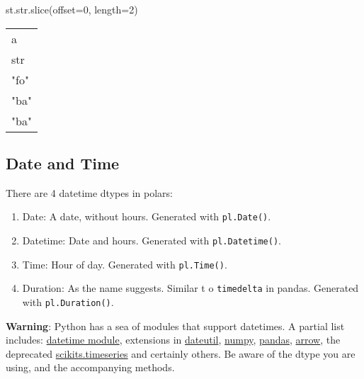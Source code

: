 \documentclass[
  letterpaper,
  DIV=11,
  numbers=noendperiod]{scrartcl}
\newenvironment{Shaded}{\begin{snugshade}}{\end{snugshade}}
\newcommand{\BuiltInTok}[1]{\textcolor[rgb]{0.00,0.23,0.31}{#1}}
\newcommand{\DecValTok}[1]{\textcolor[rgb]{0.68,0.00,0.00}{#1}}
\newcommand{\NormalTok}[1]{\textcolor[rgb]{0.00,0.23,0.31}{#1}}
\newcommand{\OperatorTok}[1]{\textcolor[rgb]{0.37,0.37,0.37}{#1}}
\providecommand{\tightlist}{%
  \setlength{\itemsep}{0pt}\setlength{\parskip}{0pt}}\usepackage{longtable,booktabs,array}
\begin{document}
\begin{Shaded}
\begin{Highlighting}[]
\NormalTok{st.}\BuiltInTok{str}\NormalTok{.}\BuiltInTok{slice}\NormalTok{(offset}\OperatorTok{=}\DecValTok{0}\NormalTok{, length}\OperatorTok{=}\DecValTok{2}\NormalTok{)}
\end{Highlighting}
\end{Shaded}

\begin{longtable}[]{@{}l@{}}
\toprule()
a \\
str \\
\midrule()
\endhead
"fo" \\
"ba" \\
"ba" \\
\bottomrule()
\end{longtable}

\hypertarget{date-and-time}{%
\subsection{Date and Time}\label{date-and-time}}

There are 4 datetime dtypes in polars:

\begin{enumerate}
\def\labelenumi{\arabic{enumi}.}
\tightlist
\item
  Date: A date, without hours. Generated with \texttt{pl.Date()}.
\item
  Datetime: Date and hours. Generated with \texttt{pl.Datetime()}.
\item
  Time: Hour of day. Generated with \texttt{pl.Time()}.
\item
  Duration: As the name suggests. Similar t o \texttt{timedelta} in
  pandas. Generated with \texttt{pl.Duration()}.
\end{enumerate}

\textbf{Warning}: Python has a sea of modules that support datetimes. A
partial list includes:
\href{https://docs.python.org/3/library/datetime.html}{datetime module},
extensions in
\href{https://dateutil.readthedocs.io/en/stable/}{dateutil},
\href{https://numpy.org/doc/stable/reference/arrays.datetime.html}{numpy},
\href{https://pandas.pydata.org/pandas-docs/version/1.1/user_guide/timeseries.html}{pandas},
\href{https://arrow.readthedocs.io/en/latest/}{arrow}, the deprecated
\href{https://pytseries.sourceforge.net/}{scikits.timeseries} and
certainly others. Be aware of the dtype you are using, and the
accompanying methods.
\end{document}
